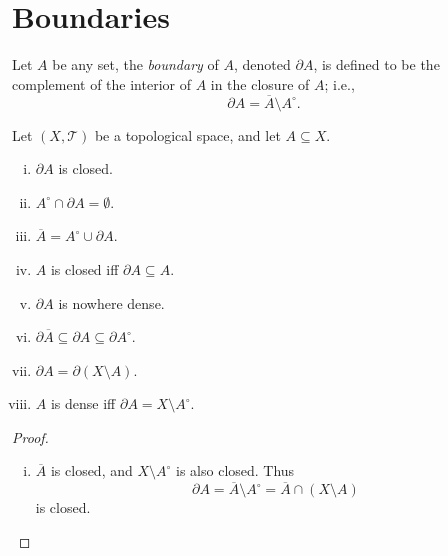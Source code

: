 \section{Boundaries}


\begin{definition}
	[boundaries]
	\label{def: boundaries}
	Let $A$ be any set, the \textit{boundary} of $A$, denoted $\partial A$, is defined to be the complement of the interior of $A$ in the closure of $A$; i.e.,
	$$
	\partial A = \overline A \setminus A^\circ.
	$$
\end{definition}


\begin{proposition}
	\label{prop: properties of boundaries}
	Let $(X, \mathcal T)$ be a topological space, and let $A \subseteq X$.
	\begin{enumerate}[(i)]
		\item 
		$\partial A$ is closed.
		
		\item
		$A^\circ \cap \partial A = \emptyset$.
		
		\item
		$\overline A = A^\circ \cup \partial A$.
		
		\item
		$A$ is closed iff $\partial A \subseteq A$.
		
		\item
		$\partial A$ is nowhere dense.
		
		\item
		$\partial \overline A \subseteq \partial A \subseteq \partial A^\circ$.
		
		\item
		$\partial A = \partial (X \setminus A)$.
		
		\item
		$A$ is dense iff $\partial A = X \setminus A^\circ$.
		
	\end{enumerate}
	
	\begin{proof} \
		\begin{enumerate}[(i)]
			\item
			$\overline A$ is closed, and $X \setminus A^\circ$ is also closed. Thus
			$$
			\partial A = \overline A \setminus A^\circ = \overline A \cap (X \setminus A)
			$$
			is closed.
			

\end{enumerate}
\end{proof}
\end{proposition}
